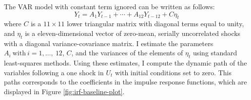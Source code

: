 \documentclass[12pt,twoside]{reedthesis}
\begin{document}
The VAR model with constant term ignored can be written as follows:
\begin{equation}
  Y_{t} = A_{1}Y_{t - 1} + \cdots + A_{12}Y_{t - 12} + C \eta_{t}
\end{equation}
where \(C\) is a \(11 \times 11\) lower triangular matrix with diagonal terms equal to unity, and \(\eta_{t}\) is a eleven-dimensional vector of zero-mean, serially uncorrelated shocks with a diagonal variance-covariance matrix. I estimate the parameters \(A_{i} ~ \text{with} ~ i=1, \ldots, ~ 12\), \(C\), and the variances of the elements of \(\eta_{t}\) using standard least-squares methods. Using these estimates, I compute the dynamic path of the variables following a one shock in \(U_{t}\) with initial conditions set to zero. This paths corresponds to the coefficients in the impulse response functions, which are displayed in Figure \ref{fig:irf-baseline-plot}.
\end{document}
